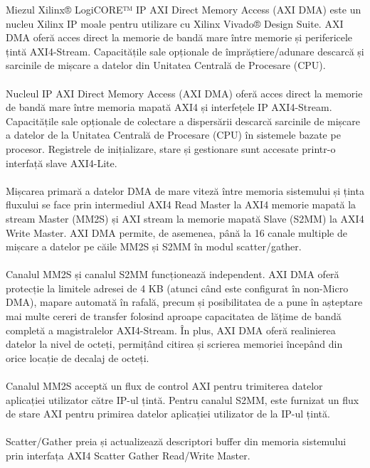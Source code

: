 \documentclass[12pt]{article}
\begin{document}
\hspace*{1cm}Miezul Xilinx® LogiCORE™ IP AXI Direct Memory Access (AXI DMA) este un nucleu Xilinx IP moale pentru utilizare cu Xilinx Vivado® Design Suite. AXI DMA oferă acces direct la memorie de bandă mare între memorie și perifericele țintă AXI4-Stream. Capacitățile sale opționale de împrăștiere/adunare descarcă și sarcinile de mișcare a datelor din Unitatea Centrală de Procesare (CPU).\\\\
\hspace*{1cm}Nucleul IP AXI Direct Memory Access (AXI DMA) oferă acces direct la memorie de bandă mare între memoria mapată AXI4 și interfețele IP AXI4-Stream. Capacitățile sale opționale de colectare a dispersării descarcă sarcinile de mișcare a datelor de la Unitatea Centrală de Procesare (CPU) în sistemele bazate pe procesor. Registrele de inițializare, stare și gestionare sunt accesate printr-o interfață slave AXI4-Lite.\\\\
\hspace*{1cm}Mișcarea primară a datelor DMA de mare viteză între memoria sistemului și ținta fluxului se face prin intermediul AXI4 Read Master la AXI4 memorie mapată la stream Master (MM2S) și AXI stream la memorie mapată Slave (S2MM) la AXI4 Write Master. AXI DMA permite, de asemenea, până la 16 canale multiple de mișcare a datelor pe căile MM2S și S2MM în modul scatter/gather.\\\\
\hspace*{1cm}Canalul MM2S și canalul S2MM funcționează independent. AXI DMA oferă protecție la limitele adresei de 4 KB (atunci când este configurat în non-Micro DMA), mapare automată în rafală, precum și posibilitatea de a pune în așteptare mai multe cereri de transfer folosind aproape capacitatea de lățime de bandă completă a magistralelor AXI4-Stream. În plus, AXI DMA oferă realinierea datelor la nivel de octeți, permițând citirea și scrierea memoriei începând din orice locație de decalaj de octeți.\\\\
\hspace*{1cm}Canalul MM2S acceptă un flux de control AXI pentru trimiterea datelor aplicației utilizator către IP-ul țintă. Pentru canalul S2MM, este furnizat un flux de stare AXI pentru primirea datelor aplicației utilizator de la IP-ul țintă.\\\\
\hspace*{1cm}Scatter/Gather preia și actualizează descriptori buffer din memoria sistemului prin interfața AXI4 Scatter Gather Read/Write Master.\\\\
\end{document}
